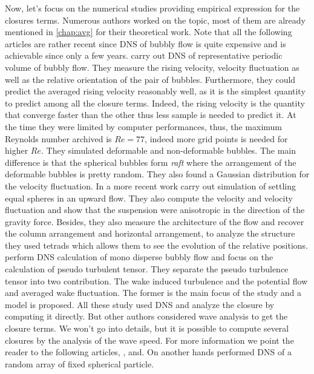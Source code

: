 Now, let's focus on the numerical studies providing empirical expression for the closures terms. 
Numerous authors worked on the topic, most of them are already mentioned in \ref{chap:avg} for their theoretical work. 
Note that all the following articles are rather recent since DNS of bubbly flow is quite expensive and is achievable since only a few years. 
\citet{esmaeeli2005direct}carry out  DNS of representative periodic volume of bubbly flow. 
They measure the rising velocity, velocity fluctuation as well as the relative orientation of the pair of bubbles.
Furthermore, they could predict the averaged rising velocity reasonably well, as it is the simplest quantity to predict among all the closure terms.
Indeed, the rising  velocity is the quantity that converge faster than the other thus less sample is needed to predict it.
At the time they were limited by computer performances, thus, the maximum Reynolds number archived is $Re  = 77$, indeed more grid points is needed for higher $Re$. 
They simulated deformable and non-deformable bubbles.
The main difference is that the spherical bubbles form \textit{raft} where the arrangement of the deformable bubbles is pretty random. 
They also found a Gaussian distribution for the velocity fluctuation.
In a more recent work \citet{willen2019resolved} carry out simulation of settling equal spheres in an upward flow.
They also compute the velocity and velocity fluctuation and show that the suspension were anisotropic in the direction of the gravity force.
Besides, they also measure the architecture of the flow and recover the column arrangement and horizontal arrangement, to analyze the structure they used tetrads which allows them to see the evolution of the relative positions.
\citet{du2022analysis} perform DNS calculation of mono disperse bubbly flow and focus on the calculation of pseudo turbulent tensor. 
They separate the pseudo turbulence tensor into two contribution.
The wake induced turbulence and the potential flow and averaged wake fluctuation.
The former is the main focus of the study and a model is proposed.
All these study used DNS and analyze the closure by computing it directly.
But other authors considered wave analysis to get the closure terms. 
We won't go into details, but it is possible to compute several closures by the analysis of the wave speed.
For more information we point the reader to the following articles,  \cite{duru2002constitutive}, \citet{willen2017continuity} and\citet{derksen2007direct}.
On another hands \citet{wang2021numerical} performed DNS of a random array of fixed spherical particle.
